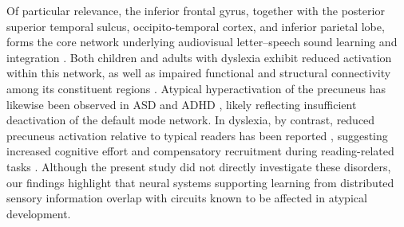 \documentclass{article}
\begin{document}
Of particular relevance, the inferior frontal gyrus, together with the posterior superior temporal sulcus, occipito-temporal cortex, and inferior parietal lobe, forms the core network underlying audiovisual letter–speech sound learning and integration \cite{richlan2019functional}. Both children and adults with dyslexia exhibit reduced activation within this network, as well as impaired functional and structural connectivity among its constituent regions \cite{richlan2019functional}. Atypical hyperactivation of the precuneus has likewise been observed in ASD \cite{may2020frontoparietal, christakou2013disorder} and ADHD \cite{christakou2013disorder}, likely reflecting insufficient deactivation of the default mode network. In dyslexia, by contrast, reduced precuneus activation relative to typical readers has been reported \cite{maisog2008meta, martin2016dyslexic}, suggesting increased cognitive effort and compensatory recruitment during reading-related tasks \cite{martin2016dyslexic, richlan2011meta}. Although the present study did not directly investigate these disorders, our findings highlight that neural systems supporting learning from distributed sensory information overlap with circuits known to be affected in atypical development.\newline
\end{document}

